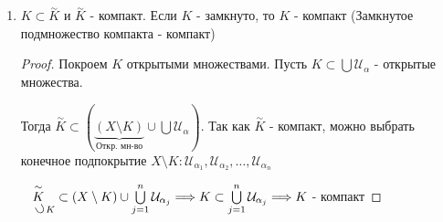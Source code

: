 \begin{theorem-non}
\begin{enumerate}
\begin{proof}
            Проверим, что дополнение $K$ открыто. Возьмем $a \notin K$ и покажем, что 
            $B_r(a) \subset X \setminus K$ для некоторого $r > 0$. Для $x \in K$ возьмем шарик $B_{\rho(x, a)/2}(x) =: \mathcal{U}_x$
            - открытое множество $\mathcal{U}_x \cap B_{\rho(x, a)/2}(a) \neq \varnothing \Longrightarrow K \subset \bigcup\limits_{x \in K} \mathcal{U}_x$.
            Так как $K$ - компакт, можно вырбрать $\mathcal{U}_{x_1}, \mathcal{U}_{x_2}, \dots, \mathcal{U}_{x_n}$, такие что $K \subset \bigcup\limits_{j = 1}^{n} \mathcal{U}_{x_j}
            \quad \mathcal{U}_{x_j} \cap B_{r_j}(a) = \varnothing, \; r_j = \rho(x_j, a)/2$. Если $r = min \ r_j$, то $\mathcal{U}_{x_j} \cap B_{r}(a) = \varnothing \Longrightarrow K \cap B_r(a) = \varnothing 
            \Longrightarrow B_r(a) \subset X \setminus K$ 

            Теперь проверим ограниченность. Возьмем $a \in X$. Тогда $K \subset \bigcup\limits_{n = 1}^{\infty} B_n(a)$.
            Если $x \in K$, то расстрояние между $x$ и $a$ будет конечным, а значит есть такой натуральный номер, который больше, 
            чем это расстояние $\Longrightarrow x \in B_n(a)$. Так как $K$ - компакт, можно выбрать конечное подпокрытие 
            $B_1(a), \dots, B_n(a) \qquad K \subset \bigcup\limits_{j = 1}^{n} B_j(a) = B_n(a) \Longrightarrow K$ содержится в каком то шаре $\Longrightarrow K$ - ограниченное множество 
        \end{proof}
        \item $K \subset \overset{\mathtt{\sim}}{K}$ и $\overset{\mathtt{\sim}}{K}$ - компакт. Если $K$ - замкнуто, то $K$ - компакт
        (Замкнутое подмножество компакта - компакт)
        \begin{proof} \quad

            Покроем $K$ открытыми множествами. Пусть $K \subset \bigcup \mathcal{U}_{\alpha}$ - открытые множества. 
            
            Тогда $\overset{\mathtt{\sim}}{K} \subset (\underbrace{(X \setminus K)}_{\text{Откр. мн-во}} \cup \bigcup \mathcal{U}_{\alpha})$.
            Так как $\overset{\mathtt{\sim}}{K}$ - компакт, можно выбрать конечное подпокрытие $X \setminus K: \mathcal{U}_{\alpha_1}, \mathcal{U}_{\alpha_2}, \dots, \mathcal{U}_{\alpha_n}$

            $\underset{\quad \rotatebox[origin=c]{120}{$ \subset $} K}{\overset{\mathtt{\sim}}{K}} \subset (X \setminus K) \cup \bigcup\limits_{j = 1}^{n} \mathcal{U}_{\alpha_j} \Longrightarrow K \subset \bigcup\limits_{j = 1}^{n} \mathcal{U}_{\alpha_j} \Longrightarrow K$ - компакт
            
        \end{proof}
    \end{enumerate}
\end{theorem-non}

